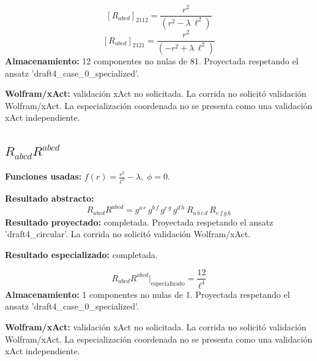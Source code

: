 \documentclass[11pt]{article}
\begin{document}
\begin{dmath*}[breakdepth={5}]
\left[R_{abcd}\right]_{2112} = \frac{{r}^{2}}{\left({r}^{2} - \lambda\,{\ell}^{2}\right)}
\end{dmath*}
\begin{dmath*}[breakdepth={5}]
\left[R_{abcd}\right]_{2121} = \frac{{r}^{2}}{\left(-{r}^{2} + \lambda\,{\ell}^{2}\right)}
\end{dmath*}
\textbf{Almacenamiento:} 12 componentes no nulas de 81. Proyectada respetando el ansatz 'draft4\_case\_0\_specialized'.\par
\textbf{Wolfram/xAct:} validación xAct no solicitada. La corrida no solicitó validación Wolfram/xAct. La especialización coordenada no se presenta como una validación xAct independiente.\par\medskip
{}
\subsection*{$ R_{abcd}R^{abcd} $}
\textbf{Funciones usadas:} $ f\!\left(r\right) = \frac{{r}^{2}}{{\ell}^{2}} - \lambda,\;\phi=0 $.\par
\textbf{Resultado abstracto:}
\begin{dmath*}[breakdepth={5}]
R_{abcd}R^{abcd} = g{}^{a\,e}\,g{}^{b\,f}\,g{}^{c\,g}\,g{}^{d\,h}\,R{}_{a\,b\,c\,d}\,R{}_{e\,f\,g\,h}
\end{dmath*}
\textbf{Resultado proyectado:} completada. Proyectada respetando el ansatz 'draft4\_circular'. La corrida no solicitó validación Wolfram/xAct.\par
\textbf{Resultado especializado:} completada.\par
\begin{dmath*}[breakdepth={5}]
R_{abcd}R^{abcd}\big|_{\mathrm{especializado}} = \frac{12}{{\ell}^{4}}
\end{dmath*}
\textbf{Almacenamiento:} 1 componentes no nulas de 1. Proyectada respetando el ansatz 'draft4\_case\_0\_specialized'.\par
\textbf{Wolfram/xAct:} validación xAct no solicitada. La corrida no solicitó validación Wolfram/xAct. La especialización coordenada no se presenta como una validación xAct independiente.\par\medskip
{}
\end{document}
